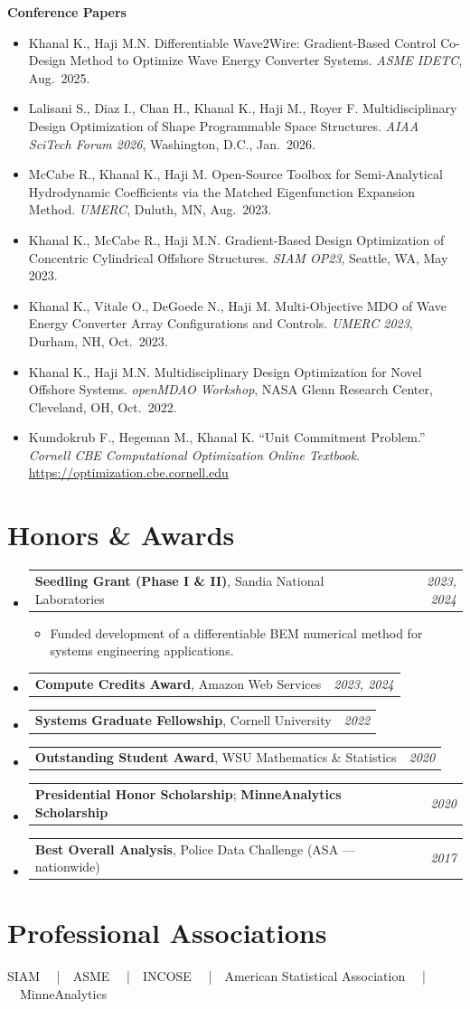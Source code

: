 \documentclass[letterpaper,11pt]{article}
\makeatletter
\newcommand{\resumeItem}[1]{%
  \item\small{#1\vspace{1pt}}%
}
\newcommand{\resumeProjectHeading}[2]{%
    \item
    \begin{tabular*}{0.97\textwidth}{l@{\extracolsep{\fill}}r}
      \small#1 & \small\textit{\color{medgray}#2} \\
    \end{tabular*}\vspace{-2pt}%
}
\newcommand{\resumeSubHeadingListStart}{\begin{itemize}[leftmargin=0.18in, label={}]}
\newcommand{\resumeSubHeadingListEnd}{\end{itemize}}
\newcommand{\resumeItemListStart}{\begin{itemize}[leftmargin=0.22in,topsep=3pt,itemsep=2pt,parsep=0pt]}
\newcommand{\resumeItemListEnd}{\end{itemize}\vspace{-2pt}}
\makeatother
\begin{document}
\vspace{4pt}
{\color{citadel}\textbf{\normalsize Conference Papers}}
\resumeItemListStart
  \resumeItem{Khanal K., Haji M.N. Differentiable Wave2Wire: Gradient-Based Control Co-Design Method to Optimize Wave Energy Converter Systems. \textit{ASME IDETC}, Aug.\ 2025.}
  \resumeItem{Lalisani S., Diaz I., Chan H., Khanal K., Haji M., Royer F. Multidisciplinary Design Optimization of Shape Programmable Space Structures. \textit{AIAA SciTech Forum 2026}, Washington, D.C., Jan.\ 2026.}
  \resumeItem{McCabe R., Khanal K., Haji M. Open-Source Toolbox for Semi-Analytical Hydrodynamic Coefficients via the Matched Eigenfunction Expansion Method. \textit{UMERC}, Duluth, MN, Aug.\ 2023.}
  \resumeItem{Khanal K., McCabe R., Haji M.N. Gradient-Based Design Optimization of Concentric Cylindrical Offshore Structures. \textit{SIAM OP23}, Seattle, WA, May 2023.}
  \resumeItem{Khanal K., Vitale O., DeGoede N., Haji M. Multi-Objective MDO of Wave Energy Converter Array Configurations and Controls. \textit{UMERC 2023}, Durham, NH, Oct.\ 2023.}
  \resumeItem{Khanal K., Haji M.N. Multidisciplinary Design Optimization for Novel Offshore Systems. \textit{openMDAO Workshop}, NASA Glenn Research Center, Cleveland, OH, Oct.\ 2022.}
  \resumeItem{Kumdokrub F., Hegeman M., Khanal K. ``Unit Commitment Problem.'' \textit{Cornell CBE Computational Optimization Online Textbook}. \url{https://optimization.cbe.cornell.edu}}
\resumeItemListEnd

\section{Honors \& Awards}
\resumeSubHeadingListStart
  \resumeProjectHeading{\textbf{\color{darkgray}Seedling Grant (Phase I \& II)}, Sandia National Laboratories}{2023, 2024}
  \resumeItemListStart
    \resumeItem{Funded development of a differentiable BEM numerical method for systems engineering applications.}
  \resumeItemListEnd
  \resumeProjectHeading{\textbf{\color{darkgray}Compute Credits Award}, Amazon Web Services}{2023, 2024}
  \resumeProjectHeading{\textbf{\color{darkgray}Systems Graduate Fellowship}, Cornell University}{2022}
  \resumeProjectHeading{\textbf{\color{darkgray}Outstanding Student Award}, WSU Mathematics \& Statistics}{2020}
  \resumeProjectHeading{\textbf{\color{darkgray}Presidential Honor Scholarship}; \textbf{\color{darkgray}MinneAnalytics Scholarship}}{2020}
  \resumeProjectHeading{\textbf{\color{darkgray}Best Overall Analysis}, Police Data Challenge (ASA --- nationwide)}{2017}
\resumeSubHeadingListEnd

\section{Professional Associations}
\vspace{2pt}
\small\color{medgray}
SIAM \ \ \textcolor{rule}{|}\ \ ASME \ \ \textcolor{rule}{|}\ \ INCOSE \ \ \textcolor{rule}{|}\ \ American Statistical Association \ \ \textcolor{rule}{|}\ \ MinneAnalytics
\end{document}
